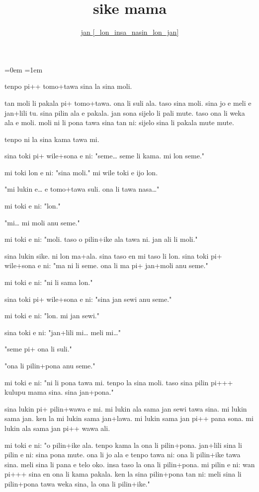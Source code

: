 \documentclass{article}
\title{sike mama}
\author{\href{https://blinry.org/sike-mama/}{jan {[}\_lon\_insa\_nasin\_lon\_jan{]}}}
\date{}
\begin{document}
\parindent=0em
\parskip=1em
\large

\maketitle

tenpo pi++ tomo+tawa sina la sina moli.

tan moli li pakala pi+ tomo+tawa. ona li suli ala. taso sina moli. sina jo e meli e jan+lili tu. sina pilin ala e pakala. jan sona sijelo li pali mute. taso ona li weka ala e moli. moli ni li pona tawa sina tan ni: sijelo sina li pakala mute mute.

tenpo ni la sina kama tawa mi.

sina toki pi+ wile+sona e ni: "seme… seme li kama. mi lon seme."

mi toki lon e ni: "sina moli." mi wile toki e ijo lon.

"mi lukin e… e tomo+tawa suli. ona li tawa nasa…"

mi toki e ni: "lon."

"mi… mi moli anu seme."

mi toki e ni: "moli. taso o pilin+ike ala tawa ni. jan ali li moli."

sina lukin sike. ni lon ma+ala. sina taso en mi taso li lon. sina toki pi+ wile+sona e ni: "ma ni li seme. ona li ma pi+ jan+moli anu seme."

mi toki e ni: "ni li sama lon."

sina toki pi+ wile+sona e ni: "sina jan sewi anu seme."

mi toki e ni: "lon. mi jan sewi."

sina toki e ni: "jan+lili mi… meli mi…"

"seme pi+ ona li suli."

"ona li pilin+pona anu seme."

mi toki e ni: "ni li pona tawa mi. tenpo la sina moli. taso sina pilin pi+++ kulupu mama sina. sina jan+pona."

sina lukin pi+ pilin+wawa e mi. mi lukin ala sama jan sewi tawa sina. mi lukin sama jan. ken la mi lukin sama jan+lawa. mi lukin sama jan pi++ pana sona. mi lukin ala sama jan pi++ wawa ali.

mi toki e ni: "o pilin+ike ala. tenpo kama la ona li pilin+pona. jan+lili sina li pilin e ni: sina pona mute. ona li jo ala e tenpo tawa ni: ona li pilin+ike tawa sina. meli sina li pana e telo oko. insa taso la ona li pilin+pona. mi pilin e ni: wan pi+++ sina en ona li kama pakala. ken la sina pilin+pona tan ni: meli sina li pilin+pona tawa weka sina, la ona li pilin+ike."
\end{document}

